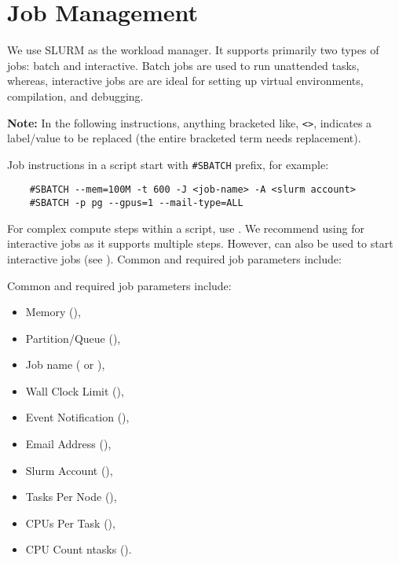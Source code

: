 \section{Job Management}
\label{sect:job-management}

We use SLURM as the workload manager. It supports primarily two types of jobs:
batch and interactive. Batch jobs are used to run unattended tasks, whereas,
interactive jobs are are ideal for setting up virtual environments, compilation, and debugging.

\noindent\textbf{Note:} In the following instructions, anything bracketed like, \verb+<>+,
indicates a label/value to be replaced (the entire bracketed term needs replacement).

\noindent Job instructions in a script start with \verb+#SBATCH+ prefix, for example:
\begin{verbatim}
    #SBATCH --mem=100M -t 600 -J <job-name> -A <slurm account>
    #SBATCH -p pg --gpus=1 --mail-type=ALL
\end{verbatim}

For complex compute steps within a script, use . We recommend using 
for interactive jobs as it supports multiple steps. However, 
can also be used to start interactive jobs (see ).
Common and required job parameters include:

Common and required job parameters include:
\begin{itemize}
	\item Memory (),
	\item Partition/Queue (),
	\item Job name ( or ),
	\item Wall Clock Limit (),
	\item Event Notification (),
	\item Email Address (),
	\item Slurm Account (),
	\item Tasks Per Node (),
	\item CPUs Per Task (),
	\item CPU Count ntasks ().
\end{itemize}

